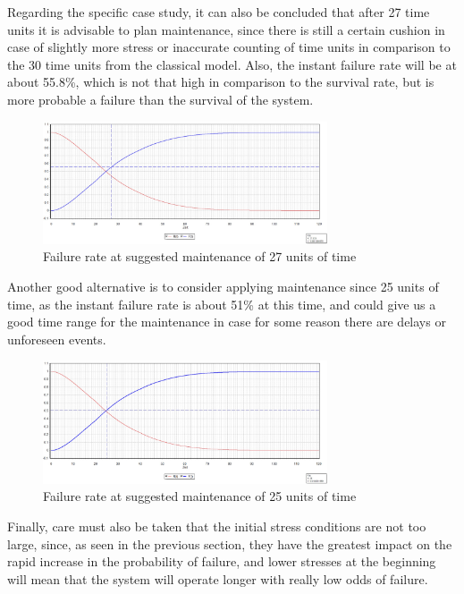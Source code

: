 \documentclass{article}
\begin{document}
\begin{doublespacing}
\par Regarding the specific case study, it can also be concluded that after 27 time units it is advisable to plan maintenance, since there is still a certain cushion in case of slightly more stress or inaccurate counting of time units in comparison to the 30 time units from the classical model. Also, the instant failure rate will be at about 55.8\%, which is not that high in comparison to the survival rate, but is more probable a failure than the survival of the system. 


\begin{figure}[H] 
    \centering
    \includegraphics[width=0.75\textwidth]{Images/Main27.JPG} 
    \caption{Failure rate at suggested maintenance of 27 units of time } 
    \label{fig:Main27} 
\end{figure}


\par Another good alternative is to consider applying maintenance since 25 units of time, as the instant failure rate is about 51\% at this time, and could give us a good time range for the maintenance in case for some reason there are delays or unforeseen events. 

\begin{figure}[H] 
    \centering
    \includegraphics[width=0.75\textwidth]{Images/Main25.JPG} 
    \caption{Failure rate at suggested maintenance of 25 units of time } 
    \label{fig:Main25} 
\end{figure}

\par Finally, care must also be taken that the initial stress conditions are not too large, since, as seen in the previous section, they have the greatest impact on the rapid increase in the probability of failure, and lower stresses at the beginning will mean that the system will operate longer with really low odds of failure. 


\end{doublespacing}
\end{document}
